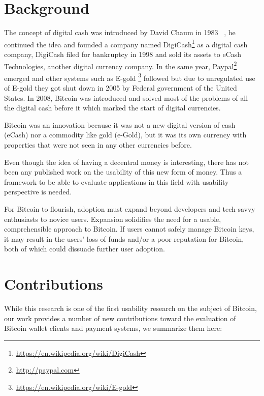 \section{Background}
The concept of digital cash was introduced by David Chaum in 1983 ~\cite{chaum1983blind}, he continued the idea and founded a company named DigiCash\footnote{\url{https://en.wikipedia.org/wiki/DigiCash}} as a digital cash company, DigiCash filed for bankruptcy in 1998 and sold its assets to eCash Technologies, another digital currency company. In the same year, Paypal\footnote{\url{http://paypal.com}} emerged and other systems such as E-gold \footnote{\url{https://en.wikipedia.org/wiki/E-gold}} followed but due to unregulated use of E-gold they got shut down in 2005 by Federal government of the United States. In 2008, Bitcoin was introduced and solved most of the problems of all the digital cash before it which marked the start of digital currencies.

Bitcoin was an innovation because it was not a new digital version of cash (eCash) nor a commodity like gold (e-Gold), but it was its own currency with properties that were not seen in any other currencies before.

Even though the idea of having a decentral money is interesting, there has not been any published work on the usability of this new form of money. Thus a framework to be able to evaluate applications in this field with usability perspective is needed.

For Bitcoin to flourish, adoption must expand beyond developers and tech-savvy enthusiasts to novice users. Expansion solidifies the need for a usable, comprehensible approach to Bitcoin. If users cannot safely manage Bitcoin keys, it may result in the users' loss of funds and/or a poor reputation for Bitcoin, both of which could dissuade further user adoption. 






\section{Contributions}
While this research is one of the first usability research on the subject of Bitcoin, our work provides a number of new contributions toward the evaluation of Bitcoin wallet clients and payment systems, we summarize them here:

